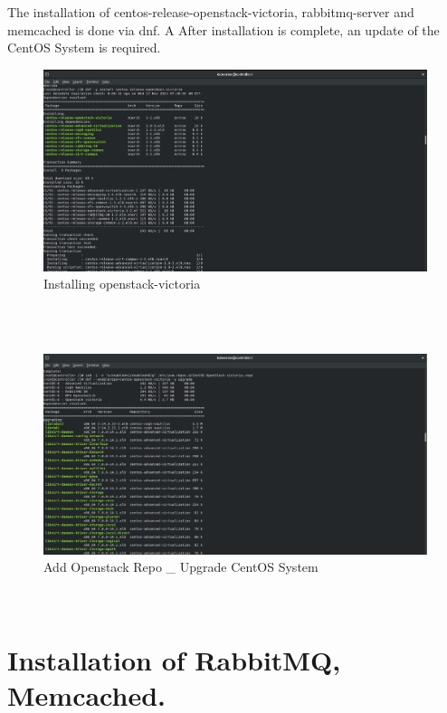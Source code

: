 \begin{spacing}{1.2}
\par The installation of centos-release-openstack-victoria, rabbitmq-server and memcached is done via dnf. A
After installation is complete, an update of the CentOS System is required. 
\\
\begin{figure}[!htb] 
\begin{center} 
\includegraphics[width=1\linewidth]{Cloud/Pre-Requirements/Installing openstack-victoria} 
\end{center} 
\caption{Installing openstack-victoria} 
\end{figure}  \FloatBarrier
\\
\\
\begin{figure}[!htb] 
\begin{center} 
\includegraphics[width=1\linewidth]{Cloud/Pre-Requirements/Add Openstack Repo _ Upgrade CentOS System} 
\end{center} 
\caption{Add Openstack Repo _ Upgrade CentOS System} 
\end{figure}  \FloatBarrier
\\

\section{Installation of RabbitMQ, Memcached.}


\end{spacing}
